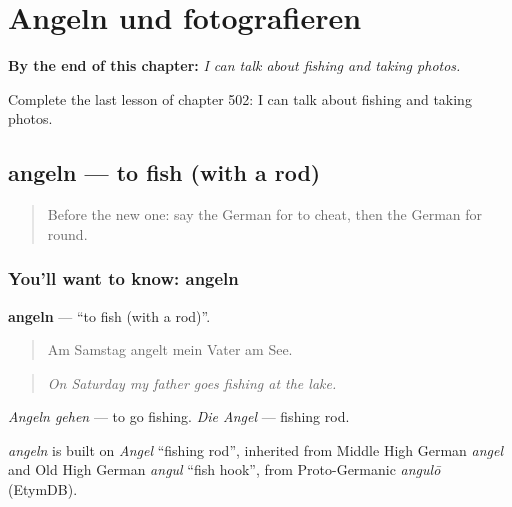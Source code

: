 
\chapter{Angeln und fotografieren}
\label{ch:ge-angeln-und-fotografieren}

\begin{chapteropening}
\textbf{By the end of this chapter:} \emph{I can talk about fishing and taking photos.}

Complete the last lesson of chapter 502: I can talk about fishing and taking photos.
\end{chapteropening}

\section[angeln]{angeln — to fish (with a rod)}

\label{lesson:GE-C502-angeln}



\begin{quote}
Before the new one: say the German for to cheat, then the German for round.
\end{quote}

\subsection*{You'll want to know: angeln}
\textbf{angeln} — \textquotedblleft{}to fish (with a rod)\textquotedblright{}.

\begin{quote}
Am Samstag angelt mein Vater am See.
\end{quote}

\begin{quote}
\emph{On Saturday my father goes fishing at the lake.}
\end{quote}

\emph{Angeln gehen} — to go fishing. \emph{Die Angel} — fishing rod.

\begin{cousinweb}
\emph{angeln} is built on \emph{Angel} \textquotedblleft{}fishing rod\textquotedblright{}, inherited from Middle High German \emph{angel} and Old High German \emph{angul} \textquotedblleft{}fish hook\textquotedblright{}, from Proto-Germanic \emph{angulō} (EtymDB).
\end{cousinweb}

